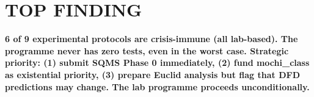 \documentclass[11pt]{article}
\begin{document}
\section*{TOP FINDING}

\begin{tcolorbox}[colback=blue!5!white, colframe=blue!70!black]
\textbf{6 of 9 experimental protocols are crisis-immune (all lab-based).
The programme never has zero tests, even in the worst case. Strategic
priority: (1) submit SQMS Phase 0 immediately, (2) fund mochi\_class
as existential priority, (3) prepare Euclid analysis but flag that
DFD predictions may change. The lab programme proceeds unconditionally.}
\end{tcolorbox}
\end{document}
